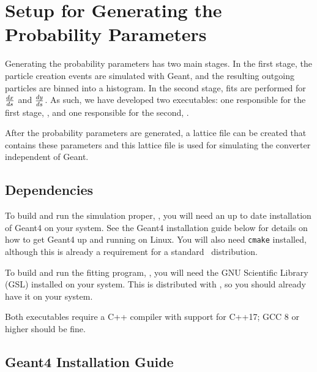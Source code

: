 \documentclass[12pt]{article}
\begin{document}

\section{Setup for Generating the Probability Parameters}

Generating the probability parameters has two main stages. In the first stage, the particle creation
events are simulated with Geant, and the resulting outgoing particles are binned into a
histogram. In the second stage, fits are performed for $\frac{dx}{ds}$ and $\frac{dy}{ds}$.  As such, we have
developed two executables: one responsible for the first stage, \exes, and one responsible for the
second, \exef.

After the probability parameters are generated, a \bmad lattice file can be created that contains
these parameters and this lattice file is used for simulating the converter independent of Geant.

\subsection{Dependencies} 
\label{s:deps} 

To build and run the simulation proper, \exes, you will need an up to date installation of Geant4 on
your system.  See the Geant4 installation guide below for details on how to get Geant4 up and
running on Linux.  You will also need \texttt{cmake} installed, although this is already a
requirement for a standard \bmad \, distribution.

To build and run the fitting program, \exef, you will need the GNU Scientific Library (GSL)
installed on your system.  This is distributed with \bmad, so you should already have it on your
system.

Both executables require a C++ compiler with support for C++17; GCC 8 or higher should be fine.

\subsection{Geant4 Installation Guide}
\end{document}
